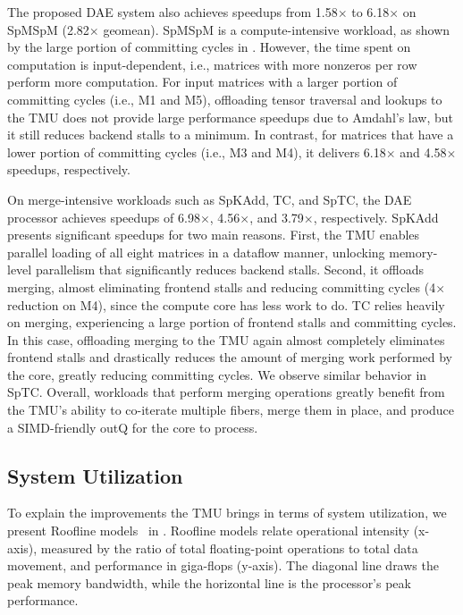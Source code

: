 The proposed DAE system also achieves speedups from 1.58$\times$ to 6.18$\times$ on SpMSpM (2.82$\times$ geomean). SpMSpM is a compute-intensive workload, as shown by the large portion of committing cycles in . However, the time spent on computation is input-dependent, i.e., matrices with more nonzeros per row perform more computation. For input matrices with a larger portion of committing cycles (i.e., M1 and M5), offloading tensor traversal and lookups to the TMU does not provide large performance speedups due to Amdahl's law, but it still reduces backend stalls to a minimum. In contrast, for matrices that have a lower portion of committing cycles (i.e., M3 and M4), it delivers 6.18$\times$ and 4.58$\times$ speedups, respectively.

On merge-intensive workloads such as SpKAdd, TC, and SpTC, the DAE processor achieves speedups of 6.98$\times$, 4.56$\times$, and 3.79$\times$, respectively. SpKAdd presents significant speedups for two main reasons. First, the TMU enables parallel loading of all eight matrices in a dataflow manner, unlocking memory-level parallelism that significantly reduces backend stalls. Second, it offloads merging, almost eliminating frontend stalls and reducing committing cycles (4$\times$ reduction on M4), since the compute core has less work to do. TC relies heavily on merging, experiencing a large portion of frontend stalls and committing cycles. In this case, offloading merging to the TMU again almost completely eliminates frontend stalls and drastically reduces the amount of merging work performed by the core, greatly reducing committing cycles. We observe similar behavior in SpTC. Overall, workloads that perform merging operations greatly benefit from the TMU's ability to co-iterate multiple fibers, merge them in place, and produce a SIMD-friendly outQ for the core to process.

\subsection{System Utilization} \label{sec:tmu-system-utilization} %



To explain the improvements the TMU brings in terms of system utilization, we present Roofline models~\cite{williams2009roofline} in . Roofline models relate operational intensity (x-axis), measured by the ratio of total floating-point operations to total data movement, and performance in giga-flops (y-axis). The diagonal line draws the peak memory bandwidth, while the horizontal line is the processor's peak performance.

